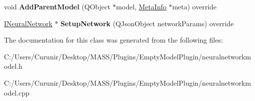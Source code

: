 \begin{DoxyCompactItemize}
\item 
\mbox{\label{class_neural_network_model_ab4aa81f9f7860f62dd7c6223cb24e455}} 
void {\bfseries Add\+Parent\+Model} (Q\+Object $\ast$model, \hyperlink{struct_meta_info}{Meta\+Info} $\ast$meta) override
\item 
\mbox{\label{class_neural_network_model_a2b115f31c0e9116c2ea3134a29e8dc24}} 
\hyperlink{class_i_neural_network_model_1_1_i_neural_network}{I\+Neural\+Network} $\ast$ {\bfseries Setup\+Network} (Q\+Json\+Object network\+Params) override
\end{DoxyCompactItemize}


The documentation for this class was generated from the following files\+:\begin{DoxyCompactItemize}
\item 
C\+:/\+Users/\+Curunir/\+Desktop/\+M\+A\+S\+S/\+Plugins/\+Empty\+Model\+Plugin/neuralnetworkmodel.\+h\item 
C\+:/\+Users/\+Curunir/\+Desktop/\+M\+A\+S\+S/\+Plugins/\+Empty\+Model\+Plugin/neuralnetworkmodel.\+cpp\end{DoxyCompactItemize}
